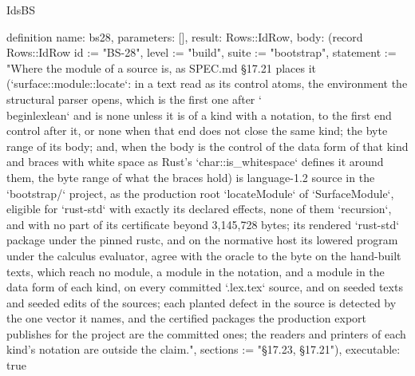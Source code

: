 \begin{lexlean}{IdsBS}
\begin{semanticmodule}
definition{
  name: bs28,
  parameters: [],
  result: Rows::IdRow,
  body: (record Rows::IdRow {id := "BS-28", level := "build", suite := "bootstrap", statement := "Where the module of a source is, as SPEC.md §17.21 places it (`surface::module::locate`: in a text read as its control atoms, the environment the structural parser opens, which is the first one after `\\begin{lexlean}` and is none unless it is of a kind with a notation, to the first end control after it, or none when that end does not close the same kind; the byte range of its body; and, when the body is the control of the data form of that kind and braces with white space as Rust's `char::is_whitespace` defines it around them, the byte range of what the braces hold) is language-1.2 source in the `bootstrap/` project, as the production root `locateModule` of `SurfaceModule`, eligible for `rust-std` with exactly its declared effects, none of them `recursion`, and with no part of its certificate beyond 3,145,728 bytes; its rendered `rust-std` package under the pinned rustc, and on the normative host its lowered program under the calculus evaluator, agree with the oracle to the byte on the hand-built texts, which reach no module, a module in the notation, and a module in the data form of each kind, on every committed `.lex.tex` source, and on seeded texts and seeded edits of the sources; each planted defect in the source is detected by the one vector it names, and the certified packages the production export publishes for the project are the committed ones; the readers and printers of each kind's notation are outside the claim.", sections := "§17.23, §17.21"}),
  executable: true
}


\end{semanticmodule}
\end{lexlean}
